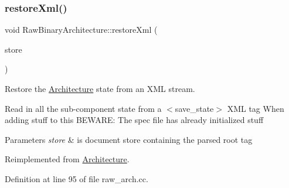 \subsubsection{\texorpdfstring{restoreXml()}{restoreXml()}}
{\footnotesize\ttfamily void Raw\+Binary\+Architecture\+::restore\+Xml (\begin{DoxyParamCaption}\item[{\mbox{\hyperlink{class_document_storage}{Document\+Storage}} \&}]{store }\end{DoxyParamCaption})\hspace{0.3cm}{\ttfamily [virtual]}}



Restore the \mbox{\hyperlink{class_architecture}{Architecture}} state from an X\+ML stream. 

Read in all the sub-\/component state from a $<$save\+\_\+state$>$ X\+ML tag When adding stuff to this B\+E\+W\+A\+RE\+: The spec file has already initialized stuff 
\begin{DoxyParams}{Parameters}
{\em store} & is document store containing the parsed root tag \\
\hline
\end{DoxyParams}


Reimplemented from \mbox{\hyperlink{class_architecture_ab15a398b9f84dd62ad36d1e83895783a}{Architecture}}.



Definition at line 95 of file raw\+\_\+arch.\+cc.

